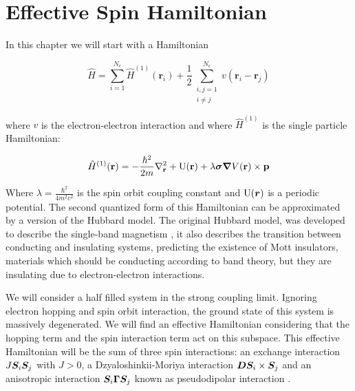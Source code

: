 \chapter{Effective Spin Hamiltonian}

In this chapter we will start with a Hamiltonian

\begin{equation}
\label{Ham1}
\hat{H} = \sum_{i=1}^{N_e} \hat{H}^{(1)}(\textbf{r}_i) + \frac{1}{2} \sum_{\substack{i,j = 1 \\ i \neq j}} ^ {N_e} v(\textbf{r}_i - \textbf{r}_j)
\end{equation}

where $v$ is the electron-electron interaction and where $\hat{H}^{(1)}$ is the single particle Hamiltonian:

\begin{equation}
\hat{H}^{(1)}(\textbf{r}) = -\frac{\hbar^2}{2m}\nabla^2_{\textbf{r}} + \text{U}(\textbf{r}) + \lambda\boldsymbol{\sigma}\boldsymbol{\nabla}V(\textbf{r}) \times \textbf{p}
\end{equation}

Where $\lambda = \frac{\hbar^2}{4m^2c^2}$ is the spin orbit coupling constant and $\text{U}(\boldsymbol{r})$ is a periodic potential. The second quantized form of this Hamiltonian can be approximated by a version of the Hubbard model. The original Hubbard model, was developed to describe the single-band magnetism \cite{Hubbard1963}, it also describes the transition between conducting and insulating systems, predicting the existence of Mott insulators, materials which should be conducting according to band theory, but they are insulating due to electron-electron interactions.

We will consider a half filled system in the strong coupling limit. Ignoring electron hopping and spin orbit interaction, the ground state of this system is massively degenerated. We will find an effective Hamiltonian considering that the hopping term and the spin interaction term act on this subspace. This effective Hamiltonian will be the sum of three spin interactions: an exchange interaction $J\boldsymbol{S}_i\boldsymbol{S}_j$ with $J>0$, a Dzyaloshinkii-Moriya interaction $\boldsymbol{D}\boldsymbol{S}_i\times\boldsymbol{S}_j$ and an anisotropic interaction $\boldsymbol{S}_i \boldsymbol{\Gamma} \boldsymbol{S}_j$ known as pseudodipolar interaction \cite{Moriya1960}.

